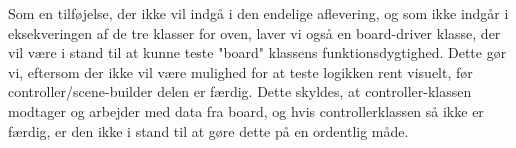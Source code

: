 Som en tilføjelse, der ikke vil indgå i den endelige aflevering, og som ikke indgår i eksekveringen af de tre klasser for oven, laver vi også en board-driver klasse, der vil være i stand til at kunne teste "board" klassens funktionsdygtighed. Dette gør vi, eftersom der ikke vil være mulighed for at teste logikken rent visuelt, før controller/scene-builder delen er færdig. Dette skyldes, at controller-klassen modtager og arbejder med data fra board, og hvis controllerklassen så ikke er færdig, er den ikke i stand til at gøre dette på en ordentlig måde.